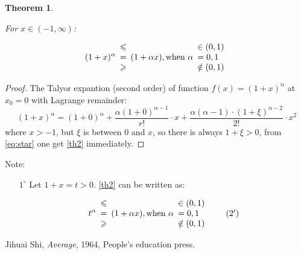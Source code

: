 \documentclass[12pt,a4paper,reqno]{amsart}
\theoremstyle{plain}
\newtheorem{Th}{Theorem}
\theoremstyle{definition}
\begin{document}
\begin{Th} \label{th2} 

  \textnormal{For} $x \in (-1, \infty)$: 

  \begin{equation}
    (1+x)^{\alpha}  \begin{array}{c}
      \leqslant \\ 
      = \\ 
      \geqslant  
    \end{array}
    (1+\alpha x), \textnormal{when}~\alpha 
    \begin{array}{l}
    \in (0,1) \\  
    = 0, 1 \\
    \notin(0, 1)     
    \end{array}
  \end{equation}
  
  \end{Th}
  
\begin{proof} The Talyor expantion (second order) of function $f(x) = (1+x)^{\alpha}$ at $x_0 = 0$ with Lagrange remainder: 
  \begin{equation}\label{eq:star}
(1+x)^{\alpha} = (1+0)^{\alpha} + \frac{\alpha(1+0)^{\alpha-1}}{r!}\cdot x + \frac{\alpha(\alpha-1)\cdot(1+\xi)^{\alpha-2}}{2!}\cdot x^2 \tag{*}    
  \end{equation}  
  where $x>-1$, but $\xi$ is between 0 and $x$, so there is always $1+\xi > 0$, from \eqref{eq:star} one get \eqref{th2} immediately.  
\end{proof}

Note: 
\begin{enumerate}

  \item [$1^{\circ}$] Let $1+x=t > 0$. \eqref{th2} can be written as:  
  
  \begin{equation}
    t^{\alpha}  \begin{array}{c}
      \leqslant \\ 
      = \\ 
      \geqslant  
    \end{array}
    (1+\alpha x), \textnormal{when}~\alpha 
    \begin{array}{l}
    \in (0,1) \\  
    = 0, 1 \\
    \notin(0, 1)     
    \end{array}
    \tag{$2^{\prime}$}
  \end{equation}

\end{enumerate}

\begin{thebibliography}{99} 

 Jihuai Shi, \textit{Average}, 1964, People's education press.  


\end{thebibliography}
\end{document}
